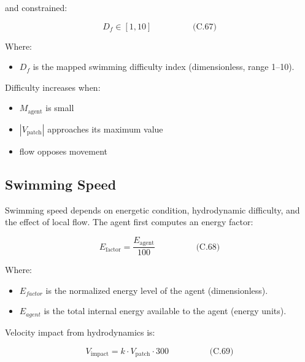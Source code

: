 \documentclass[
]{book}
\providecommand{\tightlist}{%
  \setlength{\itemsep}{0pt}\setlength{\parskip}{0pt}}
\begin{document}
and constrained:

\[
\begin{equation} D_f \in [1, 10]  \hspace{2cm} \text{(C.67)} \end{equation}
\]

Where:

\begin{itemize}
\tightlist
\item
  \(D_f\) is the mapped swimming difficulty index (dimensionless, range
  1--10).
\end{itemize}

Difficulty increases when:

\begin{itemize}
\tightlist
\item
  \(M_{\text{agent}}\) is small
\item
  \(|V_{\text{patch}}|\) approaches its maximum value
\item
  flow opposes movement
\end{itemize}

\subsection{Swimming Speed}\label{swimming-speed}

Swimming speed depends on energetic condition, hydrodynamic difficulty,
and the effect of local flow. The agent first computes an energy factor:

\[
\begin{equation} E_{\text{factor}} = \frac{E_{\text{agent}}}{100}  \hspace{2cm} \text{(C.68)} \end{equation}
\]

Where:

\begin{itemize}
\tightlist
\item
  \(E_{factor}\) is the normalized energy level of the agent
  (dimensionless).
\item
  \(E_{agent}\) is the total internal energy available to the agent
  (energy units).
\end{itemize}

Velocity impact from hydrodynamics is:

\[
\begin{equation} V_{\text{impact}} = k \cdot V_{\text{patch}} \cdot 300  \hspace{2cm} \text{(C.69)} \end{equation}
\]
\end{document}
